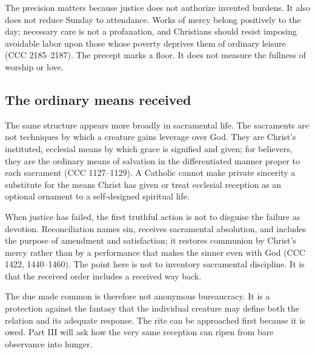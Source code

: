 The precision matters because justice does not authorize invented burdens. It also does not reduce Sunday to attendance. Works of mercy belong positively to the day; necessary care is not a profanation, and Christians should resist imposing avoidable labor upon those whose poverty deprives them of ordinary leisure (CCC 2185--2187). The precept marks a floor. It does not measure the fullness of worship or love.

\subsection{The ordinary means received}

The same structure appears more broadly in sacramental life. The sacraments are not techniques by which a creature gains leverage over God. They are Christ's instituted, ecclesial means by which grace is signified and given; for believers, they are the ordinary means of salvation in the differentiated manner proper to each sacrament (CCC 1127--1129). A Catholic cannot make private sincerity a substitute for the means Christ has given or treat ecclesial reception as an optional ornament to a self-designed spiritual life.

When justice has failed, the first truthful action is not to disguise the failure as devotion. Reconciliation names sin, receives sacramental absolution, and includes the purpose of amendment and satisfaction; it restores communion by Christ's mercy rather than by a performance that makes the sinner even with God (CCC 1422, 1440--1460). The point here is not to inventory sacramental discipline. It is that the received order includes a received way back.

The due made common is therefore not anonymous bureaucracy. It is a protection against the fantasy that the individual creature may define both the relation and its adequate response. The rite can be approached first because it is owed. Part III will ask how the very same reception can ripen from bare observance into hunger.
